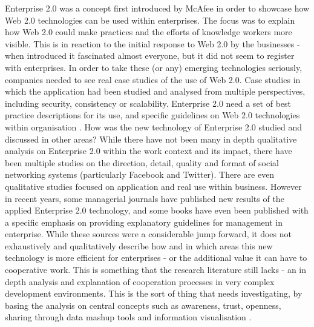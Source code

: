 Enterprise 2.0 was a concept first introduced by McAfee in order to showcase how Web 2.0 technologies can be used within enterprises. The focus was to explain how Web 2.0 could make practices and the efforts of knowledge workers more visible. This is in reaction to the initial response to Web 2.0 by the businesses - when introduced it fascinated almost everyone, but it did not seem to register with enterprises. In order to take these (or any) emerging technologies seriously, companies needed to see real case studies of the use of Web 2.0. Case studies in which the application had been studied and analysed from multiple perspectives, including security, consistency or scalability. Enterprise 2.0 need a set of best practice descriptions for its use, and specific guidelines on Web 2.0 technologies within organisation \cite{mcafee2006enterprise}. How was the new technology of Enterprise 2.0 studied and discussed in other areas? While there have not been many in depth qualitative analysis on Enterprise 2.0 within the work context and its impact, there have been multiple studies on the direction, detail, quality and format of social networking systems (particularly Facebook and Twitter). There are even qualitative studies focused on application and real use within business. However in recent years, some managerial journals have published new results of the applied Enterprise 2.0 technology, and some books have even been published with a specific emphasis on providing explanatory guidelines for management in enterprise. While these sources were a considerable jump forward, it does not exhaustively and qualitatively describe how and in which areas this new technology is more efficient for enterprises - or the additional value it can have to cooperative work. This is something that the research literature still lacks - an in depth analysis and explanation of cooperation processes in very complex development environments. This is the sort of thing that needs investigating, by basing the analysis on central concepts such as awareness, trust, openness, sharing through data mashup tools and information visualisation \cite{mcafee2013enterprise}.

